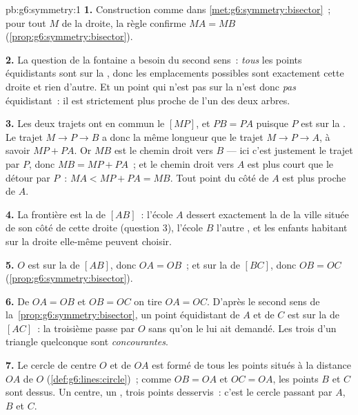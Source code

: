 \begin{solution}{pb:g6:symmetry:1}
\textbf{1.} Construction comme dans
\cref{met:g6:symmetry:bisector}~; pour tout $M$ de la droite, la
règle confirme $MA = MB$ (\cref{prop:g6:symmetry:bisector}).

\textbf{2.} La question de la fontaine a besoin du second sens~:
\emph{tous} les points équidistants sont sur la , donc les
emplacements possibles sont exactement cette droite et rien d'autre.
Et un point qui n'est pas sur la  n'est donc \emph{pas}
équidistant~: il est strictement plus proche de l'un des deux arbres.

\textbf{3.} Les deux trajets ont en commun le  $[MP]$, et
$PB = PA$ puisque $P$ est sur la . Le trajet
$M \to P \to B$ a donc la même longueur que le trajet
$M \to P \to A$, à savoir $MP + PA$. Or $MB$ est le chemin droit
vers $B$ --- ici c'est justement le trajet par $P$, donc
$MB = MP + PA$~; et le chemin droit vers $A$ est plus court que le
détour par $P$~: $MA < MP + PA = MB$. Tout point du côté de $A$ est
plus proche de $A$.

\textbf{4.} La frontière est la  de $[AB]$~: l'école $A$
dessert exactement la  de la ville située de son côté de cette
droite (question 3), l'école $B$ l'autre , et les enfants
habitant sur la droite elle-même peuvent choisir.

\textbf{5.} $O$ est sur la  de $[AB]$, donc $OA = OB$~; et
sur la  de $[BC]$, donc $OB = OC$
(\cref{prop:g6:symmetry:bisector}).

\textbf{6.} De $OA = OB$ et $OB = OC$ on tire $OA = OC$. D'après le
second sens de la~\cref{prop:g6:symmetry:bisector}, un point équidistant
de $A$ et de $C$ est sur la  de $[AC]$~: la troisième
 passe par $O$ sans qu'on le lui ait demandé. Les trois
 d'un triangle quelconque sont \emph{concourantes}.

\textbf{7.} Le cercle de centre $O$ et de  $OA$ est formé de
tous les points situés à la distance $OA$ de $O$
(\cref{def:g6:lines:circle})~; comme $OB = OA$ et $OC = OA$, les
points $B$ et $C$ sont dessus. Un centre, un , trois points
desservis~: c'est le cercle passant par $A$, $B$ et $C$.


\end{solution}
